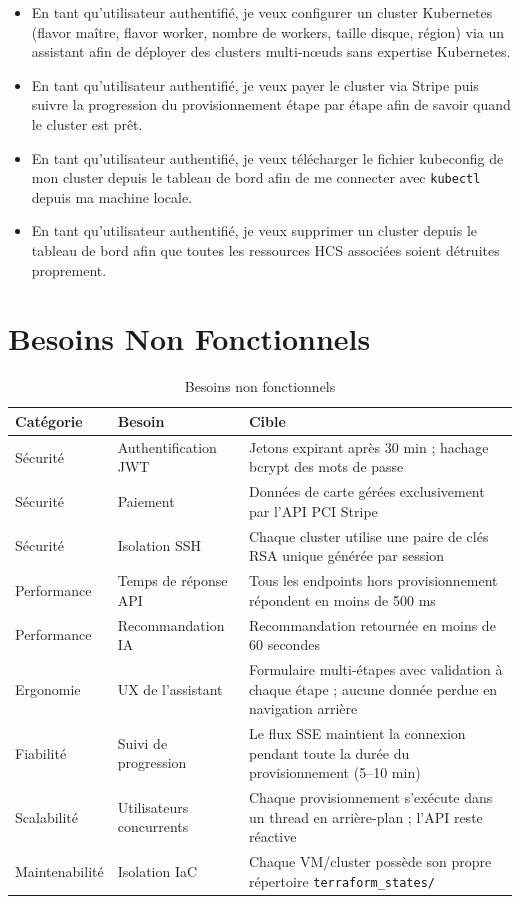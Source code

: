\begin{itemize}
  \item En tant qu'utilisateur authentifié, je veux configurer un cluster Kubernetes
        (flavor maître, flavor worker, nombre de workers, taille disque, région) via un
        assistant afin de déployer des clusters multi-nœuds sans expertise Kubernetes.
  \item En tant qu'utilisateur authentifié, je veux payer le cluster via Stripe puis
        suivre la progression du provisionnement étape par étape afin de savoir quand
        le cluster est prêt.
  \item En tant qu'utilisateur authentifié, je veux télécharger le fichier kubeconfig
        de mon cluster depuis le tableau de bord afin de me connecter avec
        \texttt{kubectl} depuis ma machine locale.
  \item En tant qu'utilisateur authentifié, je veux supprimer un cluster depuis le
        tableau de bord afin que toutes les ressources HCS associées soient détruites
        proprement.
\end{itemize}

\section{Besoins Non Fonctionnels}

\begin{table}[H]
\centering
\caption{Besoins non fonctionnels}
\label{tab:nfr}
\begin{tabularx}{\linewidth}{llX}
\toprule
\textbf{Catégorie} & \textbf{Besoin} & \textbf{Cible} \\
\midrule
Sécurité & Authentification JWT & Jetons expirant après 30 min ; hachage bcrypt des mots de passe \\
Sécurité & Paiement & Données de carte gérées exclusivement par l'API PCI Stripe \\
Sécurité & Isolation SSH & Chaque cluster utilise une paire de clés RSA unique générée par session \\
Performance & Temps de réponse API & Tous les endpoints hors provisionnement répondent en moins de 500 ms \\
Performance & Recommandation IA & Recommandation retournée en moins de 60 secondes \\
Ergonomie & UX de l'assistant & Formulaire multi-étapes avec validation à chaque étape ; aucune donnée perdue en navigation arrière \\
Fiabilité & Suivi de progression & Le flux SSE maintient la connexion pendant toute la durée du provisionnement (5--10 min) \\
Scalabilité & Utilisateurs concurrents & Chaque provisionnement s'exécute dans un thread en arrière-plan ; l'API reste réactive \\
Maintenabilité & Isolation IaC & Chaque VM/cluster possède son propre répertoire \texttt{terraform\_states/} \\
\bottomrule
\end{tabularx}
\end{table}

